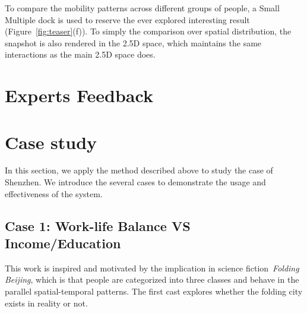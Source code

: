 To compare the mobility patterns across different groups of people, a Small Multiple dock is used to reserve the ever explored interesting result (Figure~\ref{fig:teaser}(f)). To simply the comparison over spatial distribution, the snapshot is also rendered in the 2.5D space, which maintains the same interactions as the main 2.5D space does.





\section{Experts Feedback}





\section{Case study}

In this section, we apply the method described above to study the case of Shenzhen. We introduce the several cases to demonstrate the usage and effectiveness of the system.

\subsection{Case 1: Work-life Balance VS Income/Education}

This work is inspired and motivated by the implication in science fiction~\textit{Folding Beijing}, which is that people are categorized into three classes and behave in the parallel spatial-temporal patterns. The first cast explores whether the folding city exists in reality or not.

